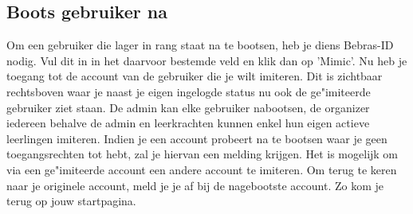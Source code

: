 \documentclass[]{article}
\begin{document}
\subsection{Boots gebruiker na}
Om een gebruiker die lager in rang staat na te bootsen, heb je diens Bebras-ID nodig. Vul dit in in het daarvoor bestemde veld en klik dan op 'Mimic'. Nu heb je toegang tot de account van de gebruiker die je wilt imiteren. Dit is zichtbaar rechtsboven waar je naast je eigen ingelogde status nu ook de ge"imiteerde gebruiker ziet staan. De admin kan elke gebruiker nabootsen, de organizer iedereen behalve de admin en leerkrachten kunnen enkel hun eigen actieve leerlingen imiteren. Indien je een account probeert na te bootsen waar je geen toegangsrechten tot hebt, zal je hiervan een melding krijgen. Het is mogelijk om via een ge"imiteerde account een andere account te imiteren. Om terug te keren naar je originele account, meld je je af bij de nagebootste account. Zo kom je terug op jouw startpagina. 
\end{document}
